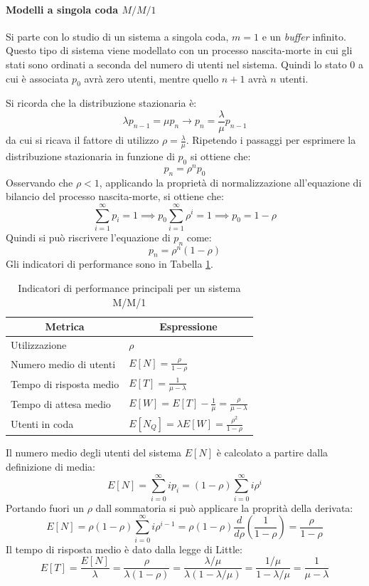 \documentclass{article}
\begin{document}
\paragraph{Modelli a singola coda $M/M/1$} Si parte con lo studio di un sistema a singola 
coda, $m=1$ e un \textit{buffer} infinito. Questo tipo di sistema viene modellato con 
un processo nascita-morte in cui gli stati sono ordinati a seconda del numero di utenti 
nel sistema. Quindi lo stato $0$ a cui è associata $p_0$ avrà zero utenti, mentre quello 
$n+1$ avrà $n$ utenti.

Si ricorda che la distribuzione stazionaria è:
\[
  \lambda p_{n-1} = \mu p_n \to p_n = \frac{\lambda}{\mu}p_{n-1}
\]
da cui si ricava il fattore di utilizzo $\rho = \frac{\lambda}{\mu}$. Ripetendo i passaggi 
per esprimere la distribuzione stazionaria in funzione di $p_0$ si ottiene che:
\[
  p_n = \rho^n p_0
\]
Osservando che $\rho < 1$, applicando la proprietà di normalizzazione all'equazione di 
bilancio del processo nascita-morte, si ottiene che:
\[
  \sum_{i=1}^\infty p_i = 1 \implies p_0\sum_{i=1}^\infty\rho^i = 1 \implies p_0 = 1 -\rho
\]
Quindi si può riscrivere l'equazione di $p_n$ come:
\[
  p_n = \rho^n(1-\rho)
\]
Gli indicatori di performance sono in Tabella \ref{tab:mm1-perf}. 

\begin{table}
  \begin{center}
    \begin{tabular}[c]{l|l}
      \hline
      \multicolumn{1}{c|}{\textbf{Metrica}} & 
      \multicolumn{1}{c}{\textbf{Espressione}} \\
      \hline
      Utilizzazione & $\rho$ \\
      Numero medio di utenti & $ E[N] = \frac{\rho}{1-\rho}$ \\
      Tempo di risposta medio & $E[T] = \frac{1}{\mu - \lambda}$\\
      Tempo di attesa medio & $E[W] = E[T] -  \frac{1}{\mu} = \frac{\rho}{\mu-\lambda}$\\
      Utenti in coda & $E[N_Q] =\lambda E[W] = \frac{\rho^2}{1-\rho}$\\
      \hline

    \end{tabular}
  \end{center}
  \caption{Indicatori di performance principali per un sistema M/M/1}
  \label{tab:mm1-perf}
\end{table}

Il numero medio degli utenti del sistema $E[N]$ è calcolato a partire dalla definizione di 
media:
\[
  E[N]=\sum_{i=0}^\infty ip_i = (1-\rho)\sum_{i=0}^\infty i\rho^i 
\]
Portando fuori un $\rho$ dall sommatoria si può applicare la proprità della derivata:
\[
  E[N]=\rho(1-\rho) \sum_{i=0}^\infty i\rho^{i-1} = \rho(1-\rho)\frac{d}{d\rho}
  \left(\frac{1}{1-\rho}\right)
  = \frac{\rho}{1-\rho}
\]
Il tempo di risposta medio è dato dalla legge di Little:
\[
  E[T] = \frac{E[N]}{\lambda}= \frac{\rho}{\lambda(1-\rho)} = \frac{\lambda/\mu}
  {\lambda(1-\lambda/\mu)}
  = \frac{1/\mu}{1-\lambda/\mu} = \frac{1}{\mu - \lambda} 
\]
\end{document}

